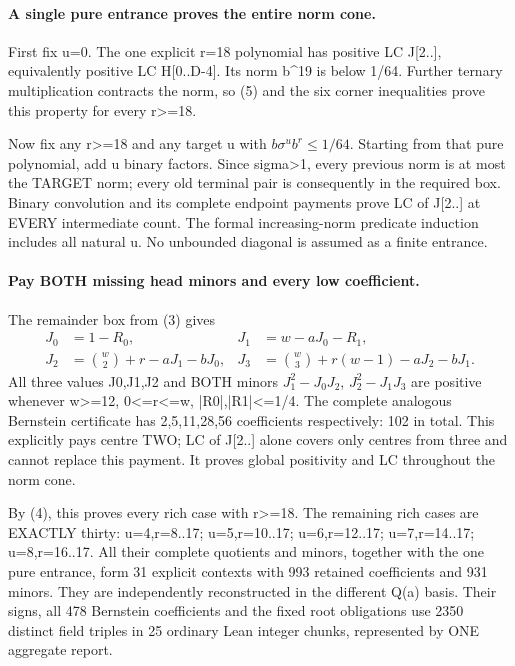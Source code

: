 \paragraph{A single pure entrance proves the entire norm cone.}
First fix u=0. The one explicit r=18 polynomial has positive LC
J[2..], equivalently positive LC H[0..D-4]. Its norm b^19 is below
1/64. Further ternary multiplication contracts the norm, so (5)
and the six corner inequalities prove this property for every r>=18.

Now fix any r>=18 and any target u with $b\sigma^u b^r\le1/64$.
Starting from that pure polynomial, add u binary factors. Since
sigma>1, every previous norm is at most the TARGET norm; every
old terminal pair is consequently in the required box. Binary
convolution and its complete endpoint payments prove LC of J[2..]
at EVERY intermediate count. The formal increasing-norm predicate
induction includes all natural u. No unbounded diagonal is assumed
as a finite entrance.

\paragraph{Pay BOTH missing head minors and every low coefficient.}
The remainder box from (3) gives
\[
 \begin{aligned}
 J_0&=1-R_0,& J_1&=w-aJ_0-R_1,\\
 J_2&={w\choose2}+r-aJ_1-bJ_0,&
 J_3&={w\choose3}+r(w-1)-aJ_2-bJ_1.
 \end{aligned}
\]
All three values J0,J1,J2 and BOTH minors
$J_1^2-J_0J_2$, $J_2^2-J_1J_3$ are positive whenever w>=12,
0<=r<=w, |R0|,|R1|<=1/4. The complete analogous Bernstein
certificate has 2,5,11,28,56 coefficients respectively: 102 in total.
This explicitly pays centre TWO; LC of J[2..] alone covers only
centres from three and cannot replace this payment.
It proves global positivity and LC throughout the norm cone.

By (4), this proves every rich case with r>=18. The remaining rich
cases are EXACTLY thirty: u=4,r=8..17; u=5,r=10..17;
u=6,r=12..17; u=7,r=14..17; u=8,r=16..17. All their complete
quotients and minors, together with the one pure entrance, form
31 explicit contexts with 993 retained coefficients and 931 minors.
They are independently reconstructed in the different Q(a) basis.
Their signs, all 478 Bernstein coefficients and the fixed root
obligations use 2350 distinct field triples in 25 ordinary Lean
integer chunks, represented by ONE aggregate report.

